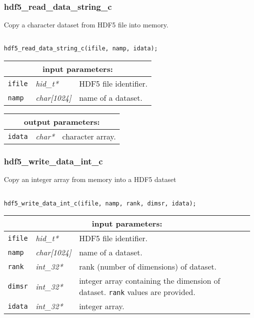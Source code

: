 \subsubsection{hdf5\_read\_data\_string\_c}

Copy a character dataset from HDF5 file into memory.

\begin{verbatim}

hdf5_read_data_string_c(ifile, namp, idata);
\end{verbatim}

\noindent
\begin{tabular}{|p{1.5cm}|p{2cm}|p{11cm}|}
\hline
\multicolumn{3}{|c|}{\bf input parameters:} \\
\hline
{\tt ifile} & {\it hid\_t*} & HDF5 file identifier. \\
\hline
{\tt namp} & {\it char[1024]} & name of a dataset. \\
\hline
\end{tabular}

\vskip 0.8cm

\noindent
\begin{tabular}{|p{1.5cm}|p{2cm}|p{11cm}|}
\hline
\multicolumn{3}{|c|}{\bf output parameters:} \\
\hline
{\tt idata} & {\it char*} & character array. \\
\hline
\end{tabular}

\subsubsection{hdf5\_write\_data\_int\_c}

Copy an integer array from memory into a HDF5 dataset

\begin{verbatim}

hdf5_write_data_int_c(ifile, namp, rank, dimsr, idata);
\end{verbatim}

\noindent
\begin{tabular}{|p{1.5cm}|p{2cm}|p{11cm}|}
\hline
\multicolumn{3}{|c|}{\bf input parameters:} \\
\hline
{\tt ifile} & {\it hid\_t*} & HDF5 file identifier. \\
\hline
{\tt namp} & {\it char[1024]} & name of a dataset. \\
\hline
{\tt rank} & {\it int\_32*} & rank (number of dimensions) of dataset. \\
\hline
{\tt dimsr} & {\it int\_32*} & integer array containing the dimension of dataset. {\tt rank} values are provided. \\
\hline
{\tt idata} & {\it int\_32*} & integer array. \\
\hline
\end{tabular}


